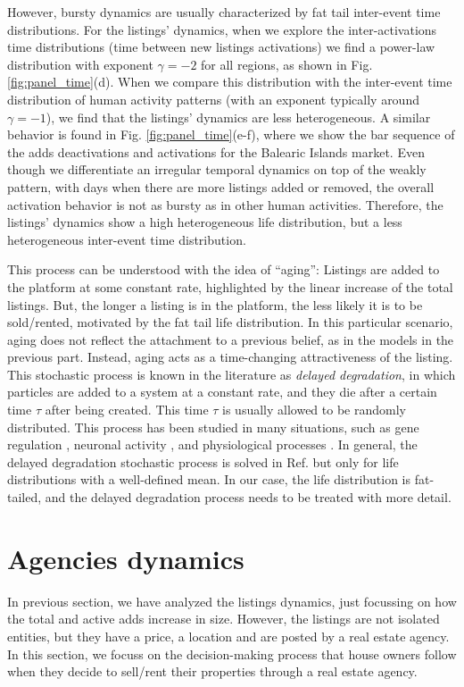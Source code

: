 However, bursty dynamics are usually characterized by fat tail inter-event time distributions. For the listings' dynamics, when we explore the inter-activations time distributions (time between new listings activations) we find a power-law distribution with exponent $\gamma = -2$ for all regions, as shown in Fig. \ref{fig:panel_time}(d). When we compare this distribution with the inter-event time distribution of human activity patterns (with an exponent typically around $\gamma = -1$), we find that the listings' dynamics are less heterogeneous. A similar behavior is found in Fig. \ref{fig:panel_time}(e-f), where we show the bar sequence of the adds deactivations and activations for the Balearic Islands market. Even though we differentiate an irregular temporal dynamics on top of the weakly pattern, with days when there are more listings added or removed, the overall activation behavior is not as bursty as in other human activities. Therefore, the listings' dynamics show a high heterogeneous life distribution, but a less heterogeneous inter-event time distribution.

This process can be understood with the idea of ``aging'': Listings are added to the platform at some constant rate, highlighted by the linear increase of the total listings. But, the longer a listing is in the platform, the less likely it is to be sold/rented, motivated by the fat tail life distribution. In this particular scenario, aging does not reflect the attachment to a previous belief, as in the models in the previous part. Instead, aging acts as a time-changing attractiveness of the listing. This stochastic process is known in the literature as \textit{delayed degradation}, in which particles are added to a system at a constant rate, and they die after a certain time $\tau$ after being created. This time $\tau$ is usually allowed to be randomly distributed. This process has been studied in many situations, such as gene regulation \cite{}, neuronal activity \cite{}, and physiological processes \cite{}. In general, the delayed degradation stochastic process is solved in Ref. \cite{LaFuerza2013} but only for life distributions with a well-defined mean. In our case, the life distribution is fat-tailed, and the delayed degradation process needs to be treated with more detail.

\section{Agencies dynamics}

In previous section, we have analyzed the listings dynamics, just focussing on how the total and active adds increase in size. However, the listings are not isolated entities, but they have a price, a location and are posted by a real estate agency. In this section, we focuss on the decision-making process that house owners follow when they decide to sell/rent their properties through a real estate agency. 

